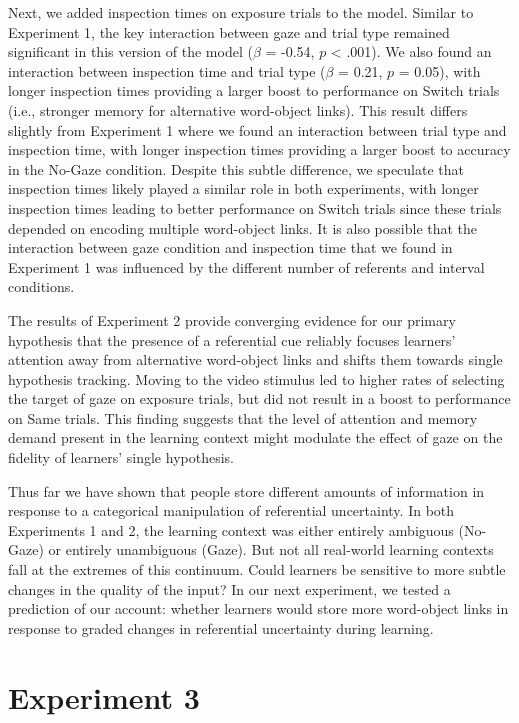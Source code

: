 \documentclass[oneside]{report}
\begin{document}
Next, we added inspection times on exposure trials to the model. Similar
to Experiment 1, the key interaction between gaze and trial type
remained significant in this version of the model (\(\beta\) = -0.54,
\(p\) \textless{} .001). We also found an interaction between inspection
time and trial type (\(\beta\) = 0.21, \(p\) = 0.05), with longer
inspection times providing a larger boost to performance on Switch
trials (i.e., stronger memory for alternative word-object links). This
result differs slightly from Experiment 1 where we found an interaction
between trial type and inspection time, with longer inspection times
providing a larger boost to accuracy in the No-Gaze condition. Despite
this subtle difference, we speculate that inspection times likely played
a similar role in both experiments, with longer inspection times leading
to better performance on Switch trials since these trials depended on
encoding multiple word-object links. It is also possible that the
interaction between gaze condition and inspection time that we found in
Experiment 1 was influenced by the different number of referents and
interval conditions.

The results of Experiment 2 provide converging evidence for our primary
hypothesis that the presence of a referential cue reliably focuses
learners' attention away from alternative word-object links and shifts
them towards single hypothesis tracking. Moving to the video stimulus
led to higher rates of selecting the target of gaze on exposure trials,
but did not result in a boost to performance on Same trials. This
finding suggests that the level of attention and memory demand present
in the learning context might modulate the effect of gaze on the
fidelity of learners' single hypothesis.

Thus far we have shown that people store different amounts of
information in response to a categorical manipulation of referential
uncertainty. In both Experiments 1 and 2, the learning context was
either entirely ambiguous (No-Gaze) or entirely unambiguous (Gaze). But
not all real-world learning contexts fall at the extremes of this
continuum. Could learners be sensitive to more subtle changes in the
quality of the input? In our next experiment, we tested a prediction of
our account: whether learners would store more word-object links in
response to graded changes in referential uncertainty during learning.

\section{Experiment 3}\label{experiment-3}
\end{document}
